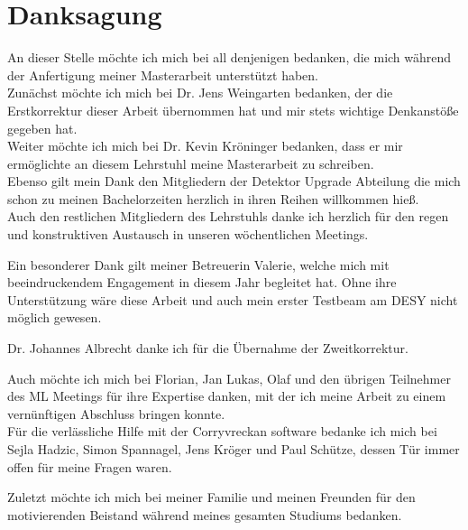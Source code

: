 \thispagestyle{empty}
\section*{Danksagung}

An dieser Stelle möchte ich mich bei all denjenigen bedanken, die mich während
der Anfertigung meiner Masterarbeit unterstützt haben. \\
Zunächst möchte ich mich bei Dr. Jens Weingarten bedanken, der die Erstkorrektur dieser Arbeit übernommen hat und mir stets wichtige Denkanstöße
gegeben hat.\\
Weiter möchte ich mich bei Dr. Kevin Kröninger bedanken, dass er mir ermöglichte an diesem Lehrstuhl meine Masterarbeit zu schreiben. \\
Ebenso gilt mein Dank den Mitgliedern der Detektor Upgrade Abteilung die mich schon zu meinen Bachelorzeiten herzlich in ihren Reihen willkommen hieß. \\
Auch den restlichen Mitgliedern des Lehrstuhls danke ich herzlich für den regen und konstruktiven Austausch in unseren wöchentlichen Meetings.

Ein besonderer Dank gilt meiner Betreuerin Valerie, welche mich mit beeindruckendem Engagement in diesem Jahr begleitet hat. Ohne ihre Unterstützung wäre
diese Arbeit und auch mein erster Testbeam am DESY nicht möglich gewesen.

Dr. Johannes Albrecht danke ich für die Übernahme der Zweitkorrektur.

Auch möchte ich mich bei Florian, Jan Lukas, Olaf und den übrigen Teilnehmer des ML Meetings für ihre Expertise danken, mit der ich meine Arbeit zu einem vernünftigen
Abschluss bringen konnte. \\
Für die verlässliche Hilfe mit der Corryvreckan software bedanke ich mich bei Sejla Hadzic, Simon Spannagel, Jens Kröger und Paul Schütze, dessen Tür immer
offen für meine Fragen waren.

Zuletzt möchte ich mich bei meiner Familie und meinen Freunden für den motivierenden Beistand
während meines gesamten Studiums bedanken.
